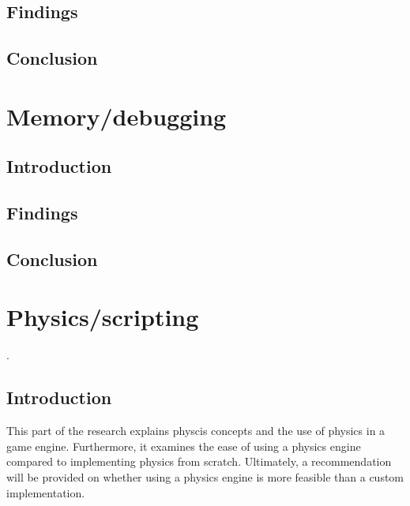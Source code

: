 \documentclass{projdoc}
\begin{document}
\subsection{Findings}

\subsection{Conclusion}

\section{Memory/debugging}

\subsection{Introduction}

\subsection{Findings}

\subsection{Conclusion}

\section{Physics/scripting}

.

\subsection{Introduction}
This part of the research explains physcis concepts and the use of physics in a game engine. Furthermore, it examines the ease of using a physics engine compared to implementing physics from scratch. Ultimately, a recommendation will be provided on whether using a physics engine is more feasible than a custom implementation.
\end{document}
